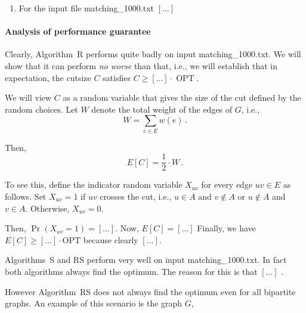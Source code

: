 \documentclass{tufte-handout}
\begin{document}
\begin{enumerate}
The distribution of cutsizes for Algorithm~RS looks as follows: $[\ldots]$

\item
For the input file matching\_1000.txt
$[\ldots]$
\end{enumerate}


\paragraph{Analysis of performance guarantee}

Clearly, Algorithm~R performs quite badly on input 
  matching\_1000.txt.
We will show that it can perform \emph{no worse} than that, i.e., we
will establish that in expectation, the cutsize $C$ satisfies $C \geq
[\ldots]\cdot \operatorname{OPT}$.


We will view $C$ as a random variable that gives the size of the cut
defined by the random choices.
Let $W$ denote the total weight of the edges of $G$, i.e.,
\[ W= \sum_{e\in E} w(e)\,.\]

Then,
\begin{equation}\label{eq: E[C]}
E[C] = \textstyle\frac{1}{2}\cdot W\,.
\end{equation}

To see this, define the indicator random variable $X_{uv}$ for every
edge $uv\in E$ as follows.
Set $X_{uv}=1$ if $uv$ crosses the cut, i.e., $u\in A$ and $v\notin A$
or $u\notin A$ and $v\in A$.
Otherwise, $X_{uv} = 0$.

Then, $\Pr(X_{uv} = 1) = [\ldots]$.
Now, $E[C]=[\ldots]$ Finally, we have 
\(E[C]\geq [\ldots]\cdot \text{OPT}\) because clearly
$[\ldots]$.

\bigskip
Algorithms~S and RS perform very well on input matching\_1000.txt. In fact
both algorithms always find the optimum. The reason for this is that $[\ldots]$
.

However Algorithm~RS does not always find the optimum even for all bipartite graphs. 
An example of this scenario is the graph $G$,
\end{document}
